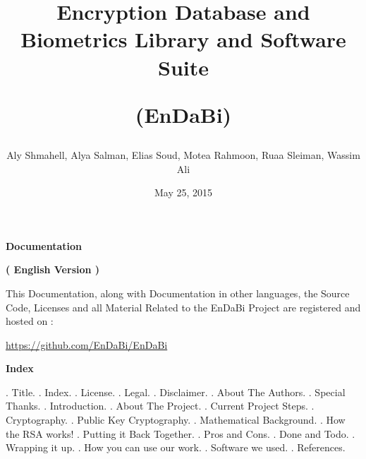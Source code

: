 \documentclass{slides}
\title{\Huge \begin{center} Encryption Database and Biometrics Library and Software Suite \end{center} \centering (EnDaBi)}
\author{Aly Shmahell, Alya Salman, Elias Soud, Motea Rahmoon, Ruaa Sleiman, Wassim Ali}
\date{May 25, 2015}
\begin{document}
\maketitle
\begin{center}
\textbf{\huge Documentation}
\end{center}
\begin{center}
\textbf{\Large ( English Version )}
\end{center}
\begin{center}
This Documentation, along with Documentation in other languages, the Source Code, Licenses and all Material Related to the EnDaBi Project are registered and hosted on :
\end{center}
\begin{center}
\url{https://github.com/EnDaBi/EnDaBi}
\end{center}
\newpage
\begin{center} 
\textbf{\Large Index}
\end{center}
 . Title.
\newline . Index.
\newline . License.
\newline . Legal.
\newline . Disclaimer.
\newline . About The Authors.
\newline . Special Thanks.
\newline . Introduction.
\newline . About The Project.
\newline . Current Project Steps.
\newline . Cryptography.
\newline . Public Key Cryptography.
\newline . Mathematical Background. 
\newline . How the RSA works!
\newline . Putting it Back Together.
\newline . Pros and Cons.
\newline . Done and Todo.
\newline . Wrapping it up.
\newline . How you can use our work.
\newline . Software we used.
\newline . References.
\end{document}
